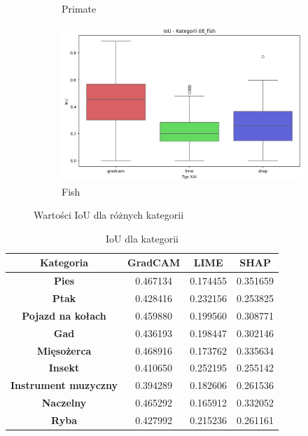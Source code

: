 \begin{figure}[h]
\begin{subfigure}[b]{0.3\textwidth}
		\caption{Primate}
	\end{subfigure}
	\begin{subfigure}[b]{0.3\textwidth}
		\centering\includegraphics[width=.9\textwidth]{img/base_iou_fish}
		\caption{Fish}
	\end{subfigure}
	\caption{Wartości IoU dla różnych kategorii}
	\label{rys:base_iou_category}
\end{figure}

\begin{table}[h]
	\centering
	\begin{tabular}{|c|c|c|c|}
		\hline
		\textbf{Kategoria}           & \textbf{GradCAM} & \textbf{LIME} & \textbf{SHAP} \\
		\hline
		\textbf{Pies}                & 0.467134         & 0.174455      & 0.351659      \\
		\hline
		\textbf{Ptak}                & 0.428416         & 0.232156      & 0.253825      \\
		\hline
		\textbf{Pojazd na kołach}    & 0.459880         & 0.199560      & 0.308771      \\
		\hline
		\textbf{Gad}                 & 0.436193         & 0.198447      & 0.302146      \\
		\hline
		\textbf{Mięsożerca}          & 0.468916         & 0.173762      & 0.335634      \\
		\hline
		\textbf{Insekt}              & 0.410650         & 0.252195      & 0.255142      \\
		\hline
		\textbf{Instrument muzyczny} & 0.394289         & 0.182606      & 0.261536      \\
		\hline
		\textbf{Naczelny}            & 0.465292         & 0.165912      & 0.332052      \\
		\hline
		\textbf{Ryba}                & 0.427992         & 0.215236      & 0.261161      \\
		\hline
	\end{tabular}
	\caption{IoU dla kategorii}
	\label{tab:base_iou_category}
\end{table}

